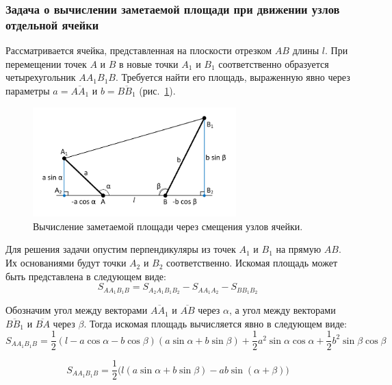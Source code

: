 \subsubsection{Задача о вычислении заметаемой площади при движении узлов отдельной ячейки}

Рассматривается ячейка, представленная на плоскости отрезком $AB$ длины $l$.
При перемещении точек $A$ и $B$ в новые точки $A_1$ и $B_1$ соответственно образуется четырехугольник $AA_1B_1B$.
Требуется найти его площадь, выраженную явно через параметры $a = \overline{AA_1}$ и $b = \overline{BB_1}$ (рис.~\ref{fig:text_1_remesh_2d_local}).

\begin{figure}[h]
\onelinecaptionstrue
\centering
\includegraphics[width=0.7\textwidth]{pics/text_1_remesh_2d/local.pdf}
\caption{Вычисление заметаемой площади через смещения узлов ячейки.}
\label{fig:text_1_remesh_2d_local}
\end{figure}

Для решения задачи опустим перпендикуляры из точек $A_1$ и $B_1$ на прямую $AB$.
Их основаниями будут точки $A_2$ и $B_2$ соответственно.
Искомая площадь может быть представлена в следующем виде:
\begin{equation}
S_{AA_1B_1B} = S_{A_2A_1B_1B_2} - S_{AA_1A_2} - S_{BB_1B_2}
\end{equation}

Обозначим угол между векторами $\overline{AA_1}$ и $\overline{AB}$ через $\alpha$, а угол между векторами $\overline{BB_1}$ и $\overline{BA}$ через $\beta$.
Тогда искомая площадь вычисляется явно в следующем виде:
\begin{equation}
S_{AA_1B_1B} = \frac{1}{2}(l - a \cos \alpha - b \cos \beta)(a \sin \alpha + b \sin \beta) + \frac{1}{2}a^2 \sin \alpha \cos \alpha + \frac{1}{2}b^2 \sin \beta \cos \beta
\end{equation}

\begin{equation}\label{eqn:text_1_remesh2_loca_square}
S_{AA_1B_1B} = \frac{1}{2}\big(l(a \sin \alpha + b \sin \beta) - ab \sin(\alpha + \beta)\big)
\end{equation}

